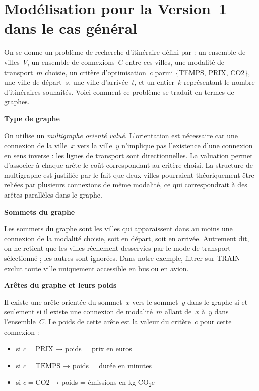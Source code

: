 \documentclass[fontsize=10pt,oneside,parskip=half]{scrreprt}
\begin{document}
\section{Modélisation pour la Version~1 dans le cas général}

On se donne un problème de recherche d'itinéraire défini par : un ensemble de
villes~$V$, un ensemble de connexions~$C$ entre ces villes, une modalité de
transport~$m$ choisie, un critère d'optimisation~$c$ parmi
\{TEMPS, PRIX, CO2\}, une ville de départ~$s$, une ville d'arrivée~$t$, et un
entier~$k$ représentant le nombre d'itinéraires souhaités. Voici comment ce
problème se traduit en termes de graphes.

\noindent\textbf{Type de graphe}

On utilise un \emph{multigraphe orienté valué}. L'orientation est nécessaire car
une connexion de la ville~$x$ vers la ville~$y$ n'implique pas l'existence d'une
connexion en sens inverse : les lignes de transport sont directionnelles. La
valuation permet d'associer à chaque arête le coût correspondant au critère
choisi. La structure de multigraphe est justifiée par le fait que deux
villes pourraient théoriquement être reliées par plusieurs connexions de même
modalité, ce qui correspondrait à des arêtes parallèles dans le graphe.

\noindent\textbf{Sommets du graphe}

Les sommets du graphe sont les villes qui apparaissent dans au moins une
connexion de la modalité choisie, soit en départ, soit en arrivée. Autrement
dit, on ne retient que les villes réellement desservies par le mode de transport
sélectionné ; les autres sont ignorées. Dans notre exemple, filtrer sur TRAIN
exclut toute ville uniquement accessible en bus ou en avion.

\noindent\textbf{Arêtes du graphe et leurs poids}

Il existe une arête orientée du sommet~$x$ vers le sommet~$y$ dans le graphe
si et seulement si il existe une connexion de modalité~$m$ allant de~$x$ à~$y$
dans l'ensemble~$C$. Le poids de cette arête est la valeur du critère~$c$ pour
cette connexion :

\begin{itemize}
  \item si $c = \text{PRIX}$ → poids = prix en euros
  \item si $c = \text{TEMPS}$ → poids = durée en minutes
  \item si $c = \text{CO2}$ → poids = émissions en kg CO\textsubscript{2}e
\end{itemize}
\end{document}
